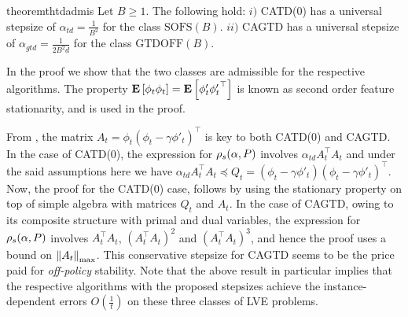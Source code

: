 \fi
\begin{restatable}{theorem}{thtdadmis}\label{th:tdadmis}
Let $B\ge 1$.
The following hold:
$i)$ CATD(0) has a universal stepsize of $\alpha_{td}=\frac{1}{B^2}$ for  the class $\text{SOFS}(B)$.
$ii)$ CAGTD has a universal stepsize of $\alpha_{gtd}=\frac{1}{2B^2 d}$ for the class $\text{GTDOFF}(B)$.
\end{restatable}
In the proof we show that the two classes are admissible for the respective algorithms.
The property $\mathbf{E}\left[\phi_t\phi_t\right]=\mathbf{E}\left[\phi'_t{\phi'_t}^\top\right]$ is known as second order feature stationarity, and is used in the proof.
\fi

From , the matrix $A_t=\phi_t(\phi_t-\gamma\phi'_t)^\top$ is key to both CATD(0) and CAGTD. In the case of CATD(0),  the expression for $\rho_s(\alpha,P)$ involves $\alpha_{td} A_t^\top A_t$ and under the said assumptions here we have $\alpha_{td} A_t^\top A_t\preceq Q_t=(\phi_t-\gamma\phi'_t)(\phi_t-\gamma\phi'_t)^\top$.  Now, the proof for the CATD(0) case, follows by using the stationary property on top of simple algebra with matrices $Q_t$ and $A_t$. In the case of CAGTD, owing to its composite structure with primal and dual variables, the expression for $\rho_s(\alpha,P)$ involves $A_t^\top A_t$, $(A_t^\top A_t)^2$ and $(A_t^\top A_t)^3$, and hence the proof uses a bound on $\left\| A_t\right\|_{\max}$. This conservative stepsize for CAGTD seems to be the price paid for \emph{off-policy} stability. 
Note that the above result in particular implies that the respective algorithms with the proposed stepsizes achieve the instance-dependent errors $O(\frac{1}{t})$ on these three classes of LVE problems.

